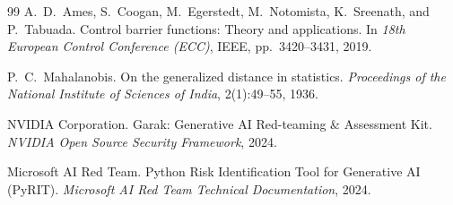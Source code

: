 \begin{thebibliography}{99}
A.~D.~Ames, S.~Coogan, M.~Egerstedt, M.~Notomista, K.~Sreenath, and P.~Tabuada.
\newblock Control barrier functions: Theory and applications.
\newblock In \emph{18th European Control Conference (ECC)}, IEEE, pp.~3420--3431, 2019.

P.~C.~Mahalanobis.
\newblock On the generalized distance in statistics.
\newblock \emph{Proceedings of the National Institute of Sciences of India}, 2(1):49--55, 1936.

NVIDIA Corporation.
\newblock Garak: Generative AI Red-teaming \& Assessment Kit.
\newblock \emph{NVIDIA Open Source Security Framework}, 2024.

Microsoft AI Red Team.
\newblock Python Risk Identification Tool for Generative AI (PyRIT).
\newblock \emph{Microsoft AI Red Team Technical Documentation}, 2024.

\end{thebibliography}
